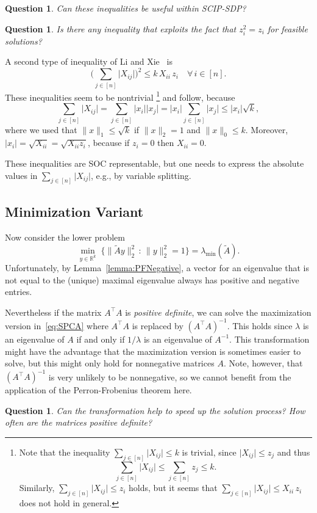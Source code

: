 \documentclass[10pt, a4paper]{article}
\newcommand{\suchthat}{\,:\,}
\newcommand{\abs}[1]{\lvert{#1}\rvert}
\newcommand{\norm}[1]{\lVert{#1}\rVert}
\newcommand{\Norm}[2]{\lVert{#1}\rVert_{#2}}
\newcommand{\T}{^{\top}}
\newcommand{\R}{\mathds{R}}
\newtheorem{question}[theorem]{Question}
\begin{document}
\begin{question}
  Can these inequalities be useful within SCIP-SDP?
\end{question}

\begin{question}
  Is there any inequality that exploits the fact that $z_i^2 = z_i$ for
  feasible solutions?
\end{question}

A second type of inequality of Li and Xie~\cite{LiX20} is
\[
  \bigg(\sum_{j \in [n]} \abs{X_{ij}}\bigg)^2 \leq k\, X_{ii}\, z_i\quad
  \forall\, i \in [n].
\]
These inequalities seem to be nontrivial
\footnote{Note that the inequality $\sum_{j \in [n]} \abs{X_{ij}} \leq k$ is trivial,
since $\abs{X_{ij}} \leq z_j$ and thus
\[
  \sum_{j \in [n]} \abs{X_{ij}} \leq \sum_{j \in [n]} z_j \leq k.
\]
Similarly, $\sum_{j \in [n]} \abs{X_{ij}} \leq z_i$ holds, but it seems
that $\sum_{j \in [n]} \abs{X_{ij}} \leq X_{ii}\, z_i$ does not hold in general.}
and follow, because
\[
  \sum_{j \in [n]} \abs{X_{ij}} = \sum_{j \in [n]} \abs{x_i} \abs{x_j} =
  \abs{x_i} \sum_{j \in [n]} \abs{x_j} \leq \abs{x_i} \sqrt{k},
\]
where we used that $\norm{x}_1 \leq \sqrt{k}$ if $\norm{x}_2 = 1$ and
$\norm{x}_0 \leq k$. Moreover, $\abs{x_i} = \sqrt{X_{ii}} = \sqrt{X_{ii}
  z_i}$, because if $z_i = 0$ then $X_{ii} = 0$.

These inequalities are SOC representable, but one needs to express the
absolute values in $\sum_{j \in [n]} \abs{X_{ij}}$, e.g., by variable
splitting.

\subsection{Minimization Variant}

Now consider the lower problem
\[
  \min_{y \in \R^k} \; \{\Norm{\tilde{A}y}{2}^2 \suchthat \Norm{y}{2}^2 =
  1\} = \lambda_{\min}(\tilde{A}).
\]
Unfortunately, by Lemma~\ref{lemma:PFNegative}, a vector for an eigenvalue
that is not equal to the (unique) maximal eigenvalue always has positive
and negative entries.

Nevertheless if the matrix $A\T A$ is \emph{positive definite}, we can
solve the maximization version in~\eqref{eq:SPCA} where $A\T A$ is replaced
by $(A\T A)^{-1}$. This holds since $\lambda$ is an eigenvalue of $A$ if
and only if $1/\lambda$ is an eigenvalue of $A^{-1}$. This transformation
might have the advantage that the maximization version is sometimes easier
to solve, but this might only hold for nonnegative matrices $A$. Note,
however, that $(A\T A)^{-1}$ is very unlikely to be nonnegative, so we
cannot benefit from the application of the Perron-Frobenius theorem here.

\begin{question}
  Can the transformation help to speed up the solution process? How often
  are the matrices positive definite?
\end{question}


\begin{small}
  
  
\end{small}
\end{document}
